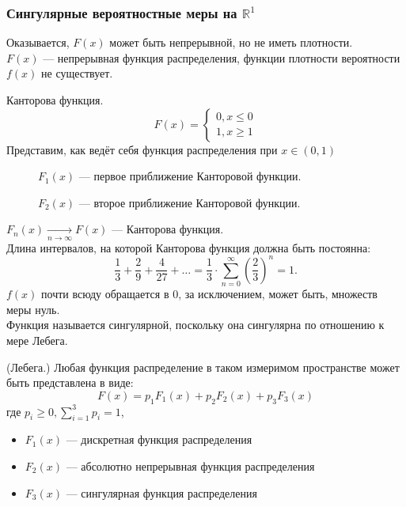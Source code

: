\subsubsection{Сингулярные вероятностные меры на $\mathbb{R}^1$}
Оказывается, $F(x)$ может быть непрерывной, но не иметь плотности. \\
$F(x)$ --- непрерывная функция распределения, функции плотности вероятности $f(x)$ не существует.
\begin{example} Канторова функция.
	\[
		F(x) =
		\begin{cases}
			0, x \leqslant 0 \\
			1, x \geqslant 1
		\end{cases}
	\]
	Представим, как ведёт себя функция распределения при $x \in (0, 1)$
	\begin{figure}[ht] %
		\centering
		\def\svgwidth{16em}
		
		\caption{$F_1(x)$ --- первое приближение Канторовой функции.}
	\end{figure}
	\begin{figure}[ht] %
		\centering
		\def\svgwidth{16em}
		
		\caption{$F_2(x)$ --- второе приближение Канторовой функции.}
	\end{figure}

	$F_n(x) \underset{n \to \infty}{\rightarrow} F(x)$ --- Канторова функция. \\
	Длина интервалов, на которой Канторова функция должна быть постоянна:
	\[
		\frac{1}{3} + \frac{2}{9} + \frac{4}{27} + \ldots = \frac{1}{3} \cdot \sum\limits_{n = 0}^\infty (\frac{2}{3})^n = 1.
	\]
	$f(x)$ почти всюду обращается в 0, за исключением, может быть, множеств меры нуль. \\
	Функция называется сингулярной, поскольку она сингулярна по отношению к мере Лебега.
\end{example}
\begin{theorem} (Лебега.)
	Любая функция распределение в таком измеримом пространстве может быть представлена в виде:
	\[
		F(x) = p_1 F_1(x) + p_2 F_2(x) + p_3 F_3(x)
	\]
	где $p_i \geqslant 0, \sum\limits_{i=1}^3 p_i = 1$,
	\begin{itemize}
		\item $F_1 (x)$ --- дискретная функция распределения
		\item $F_2 (x)$ --- абсолютно непрерывная функция распределения
		\item $F_3 (x)$ --- сингулярная функция распределения
	\end{itemize}
\end{theorem}

